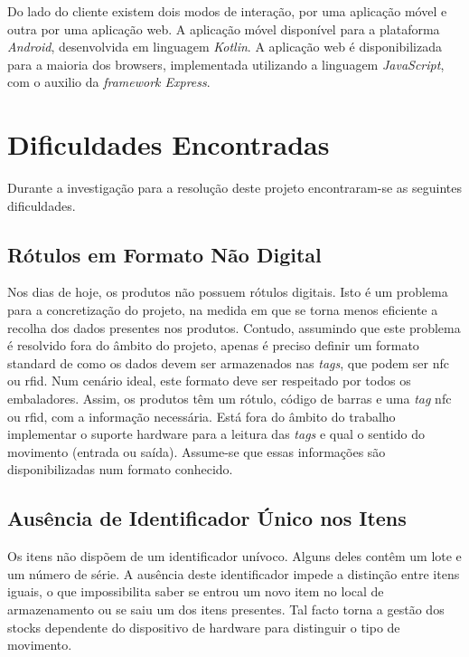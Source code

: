 Do lado do cliente existem dois modos de interação, por uma aplicação móvel e outra por uma aplicação web. A aplicação móvel disponível para a plataforma \textit{Android}, desenvolvida em linguagem \textit{Kotlin}. A aplicação web é disponibilizada para a maioria dos browsers, implementada utilizando a linguagem \textit{JavaScript}, com o auxilio da \textit{framework Express}.

%
%
\section{Dificuldades Encontradas} \label{sec33}

Durante a investigação para a resolução deste projeto encontraram-se as seguintes dificuldades.

\subsection{Rótulos em Formato Não Digital}

Nos dias de hoje, os produtos não possuem rótulos digitais. Isto é um problema para a concretização do projeto, na medida em que se torna menos eficiente a recolha dos dados presentes nos produtos. Contudo, assumindo que este problema é resolvido fora do âmbito do projeto, apenas é preciso definir um formato standard de como os dados devem ser armazenados nas \textit{tags}, que podem ser \acrshort{nfc} ou \acrshort{rfid}. Num cenário ideal, este formato deve ser respeitado por todos os embaladores. Assim, os produtos têm um rótulo, código de barras e uma \textit{tag} \acrshort{nfc} ou \acrshort{rfid}, com a informação necessária. Está fora do âmbito do trabalho implementar o suporte hardware para a leitura das \textit{tags} e qual o sentido do movimento (entrada ou saída). Assume-se que essas informações são disponibilizadas num formato conhecido. 


\subsection{Ausência de Identificador Único nos Itens}

Os itens não dispõem de um identificador unívoco. Alguns deles contêm um lote e um número de série. A ausência deste identificador impede a distinção entre itens iguais, o que impossibilita saber se entrou um novo item no local de armazenamento ou se saiu um dos itens presentes. Tal facto torna a gestão dos stocks dependente do dispositivo de hardware para distinguir o tipo de movimento.
